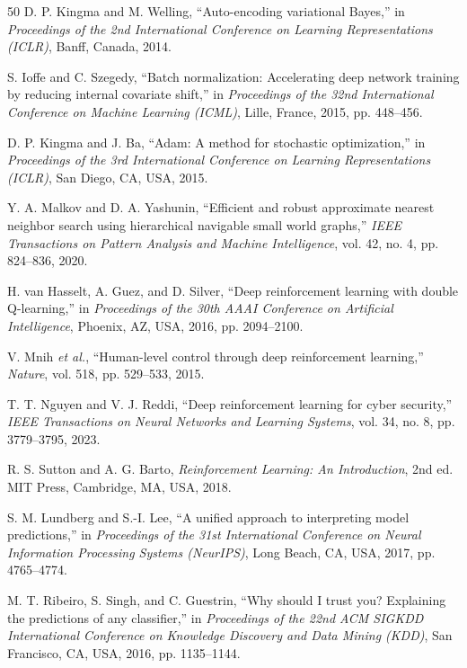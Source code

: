 \documentclass[preprint,12pt]{elsarticle}
\begin{document}
\begin{thebibliography}{50}
D. P. Kingma and M. Welling, ``Auto-encoding variational Bayes,'' in \emph{Proceedings of the 2nd International Conference on Learning Representations (ICLR)}, Banff, Canada, 2014.

S. Ioffe and C. Szegedy, ``Batch normalization: Accelerating deep network training by reducing internal covariate shift,'' in \emph{Proceedings of the 32nd International Conference on Machine Learning (ICML)}, Lille, France, 2015, pp. 448--456.

D. P. Kingma and J. Ba, ``Adam: A method for stochastic optimization,'' in \emph{Proceedings of the 3rd International Conference on Learning Representations (ICLR)}, San Diego, CA, USA, 2015.

Y. A. Malkov and D. A. Yashunin, ``Efficient and robust approximate nearest neighbor search using hierarchical navigable small world graphs,'' \emph{IEEE Transactions on Pattern Analysis and Machine Intelligence}, vol. 42, no. 4, pp. 824--836, 2020.

H. van Hasselt, A. Guez, and D. Silver, ``Deep reinforcement learning with double Q-learning,'' in \emph{Proceedings of the 30th AAAI Conference on Artificial Intelligence}, Phoenix, AZ, USA, 2016, pp. 2094--2100.

V. Mnih \emph{et al.}, ``Human-level control through deep reinforcement learning,'' \emph{Nature}, vol. 518, pp. 529--533, 2015.

T. T. Nguyen and V. J. Reddi, ``Deep reinforcement learning for cyber security,'' \emph{IEEE Transactions on Neural Networks and Learning Systems}, vol. 34, no. 8, pp. 3779--3795, 2023.

R. S. Sutton and A. G. Barto, \emph{Reinforcement Learning: An Introduction}, 2nd ed. MIT Press, Cambridge, MA, USA, 2018.

S. M. Lundberg and S.-I. Lee, ``A unified approach to interpreting model predictions,'' in \emph{Proceedings of the 31st International Conference on Neural Information Processing Systems (NeurIPS)}, Long Beach, CA, USA, 2017, pp. 4765--4774.

M. T. Ribeiro, S. Singh, and C. Guestrin, ``Why should I trust you? Explaining the predictions of any classifier,'' in \emph{Proceedings of the 22nd ACM SIGKDD International Conference on Knowledge Discovery and Data Mining (KDD)}, San Francisco, CA, USA, 2016, pp. 1135--1144.


\end{thebibliography}
\end{document}
